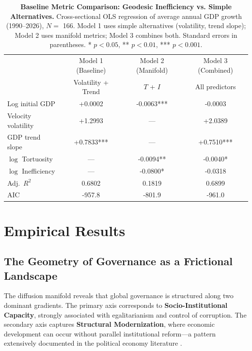 \documentclass[12pt]{article}
\begin{document}
\begin{table}[htbp]
    \centering
    \caption{\textbf{Baseline Metric Comparison: Geodesic Inefficiency vs. Simple Alternatives.} Cross-sectional OLS regression of average annual GDP growth (1990--2026), $N=$ 166. Model 1 uses simple alternatives (volatility, trend slope); Model 2 uses manifold metrics; Model 3 combines both. Standard errors in parentheses. * $p < 0.05$, ** $p < 0.01$, *** $p < 0.001$.}
    \label{tab:baseline_comparison}
    \begin{tabular}{lccc}
        \toprule
                            & Model 1 (Baseline) & Model 2 (Manifold) & Model 3 (Combined) \\
                            & Volatility + Trend & $T$ + $I$          & All predictors     \\
        \midrule
        Log initial GDP     & +0.0002            & -0.0063***         & -0.0003            \\
        Velocity volatility & +1.2993            & ---                & +2.0389            \\
        GDP trend slope     & +0.7833***         & ---                & +0.7510***         \\
        $\log$ Tortuosity   & ---                & -0.0094**          & -0.0040*           \\
        $\log$ Inefficiency & ---                & -0.0800*           & -0.0318            \\
        \midrule
        Adj.\ $R^2$         & 0.6802             & 0.1819             & 0.6899             \\
        AIC                 & -957.8             & -801.9             & -961.0             \\
        \bottomrule
    \end{tabular}
\end{table}

\section{Empirical Results}

\subsection{The Geometry of Governance as a Frictional Landscape}

\begin{sloppypar}
    The diffusion manifold reveals that global governance is structured along two dominant gradients. The primary axis corresponds to \textbf{Socio-Institutional Capacity}, strongly associated with egalitarianism and control of corruption. The secondary axis captures \textbf{Structural Modernization}, where economic development can occur without parallel institutional reform---a pattern extensively documented in the political economy literature \cite{przeworski1997modernization}.
\end{sloppypar}
\end{document}
